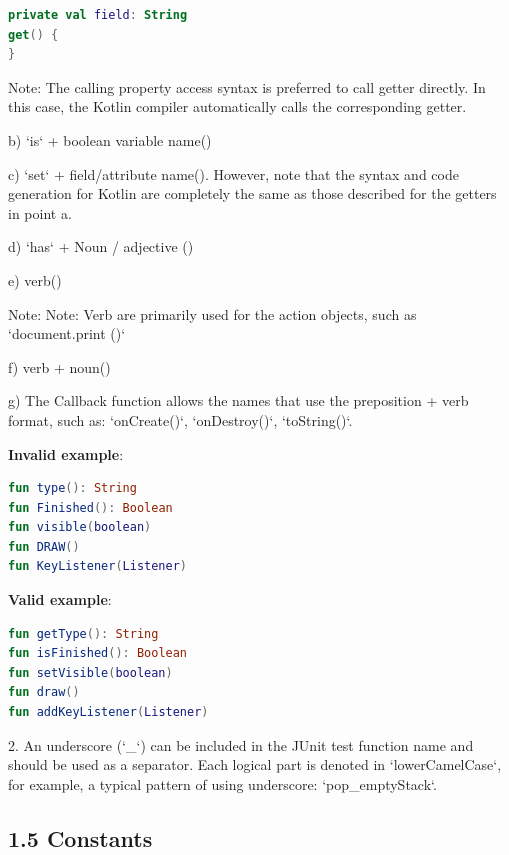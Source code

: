 \begin{lstlisting}[language=Kotlin]
private val field: String
get() {
}
\end{lstlisting}
Note: The calling property access syntax is preferred to call getter directly. In this case, the Kotlin compiler automatically calls the corresponding getter.



b) `is` + boolean variable name()



c) `set` + field/attribute name(). However, note that the syntax and code generation for Kotlin are completely the same as those described for the getters in point a.



d) `has` + Noun / adjective ()



e) verb()

Note: Note: Verb are primarily used for the action objects, such as `document.print ()`



f) verb + noun() 



g) The Callback function allows the names that use the preposition + verb format, such as: `onCreate()`, `onDestroy()`, `toString()`.



\textbf{Invalid example}: 



\begin{lstlisting}[language=Kotlin]
fun type(): String
fun Finished(): Boolean
fun visible(boolean)
fun DRAW()
fun KeyListener(Listener)
\end{lstlisting}


\textbf{Valid example}: 



\begin{lstlisting}[language=Kotlin]
fun getType(): String
fun isFinished(): Boolean
fun setVisible(boolean)
fun draw()
fun addKeyListener(Listener)
\end{lstlisting}


2.	An underscore (`_`) can be included in the JUnit test function name and should be used as a separator. Each logical part is denoted in `lowerCamelCase`, for example, a typical pattern of using underscore: `pop_emptyStack`.

\subsection*{\textbf{1.5 Constants}}


